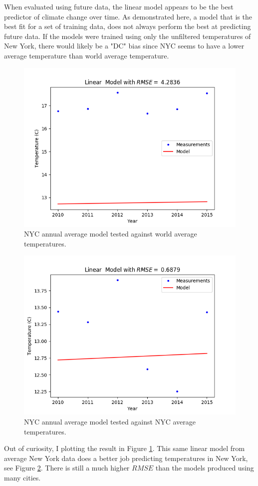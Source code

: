 \documentclass[letterpaper]{article}
\begin{document}
	When evaluated using future data, the linear model appears to be the best predictor of climate change over time.
	As demonstrated here, a model that is the best fit for a set of training data, does not always perform the best at predicting future data.
	If the models were trained using only the unfiltered temperatures of New York, there would likely be a "DC" bias since NYC seems to have a lower average temperature than world average temperature.
	\begin{figure}[h]
		\includegraphics[scale=0.625]{Figure_10_NYC_vs_world}
		\centering
		\caption{NYC annual average model tested against world average temperatures.}
		\label{fig:NYC vs world}
	\end{figure}
	\begin{figure}[h]
		\includegraphics[scale=0.625]{Figure_11_NYC_vs_future_NYC}
		\centering
		\caption{NYC annual average model tested against NYC average temperatures.}
		\label{fig:NYC vs future NYC}
	\end{figure}
	Out of curiosity, I plotting the result in Figure \ref{fig:NYC vs world}.
	This same linear model from average New York data does a better job predicting temperatures in New York, see Figure \ref{fig:NYC vs future NYC}. 
	There is still a much higher $RMSE$ than the models produced using many cities.
	
\end{document}
